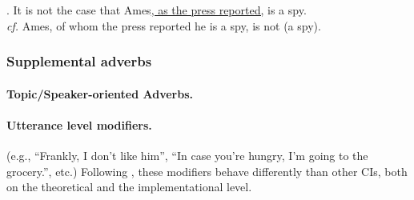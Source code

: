 \noindent\parbox[b]{\textwidth}{
\ex. It is not the case that Ames\underline{, as the press reported,} is
a spy.\\
\textit{cf.} Ames, of whom the press reported he is a spy, is not (a spy).\\

}
%
%
%
%
\subsubsection{Supplemental adverbs}

\paragraph{Topic/Speaker-oriented Adverbs.}


\paragraph{Utterance level modifiers.} (e.g., ``Frankly, I don't like him'',
``In case you're hungry, I'm going to the grocery.'', etc.) Following
\citet[pp.725-729]{amaral2007review}, these modifiers behave differently
than other CIs, both on the theoretical and the implementational level.


%
